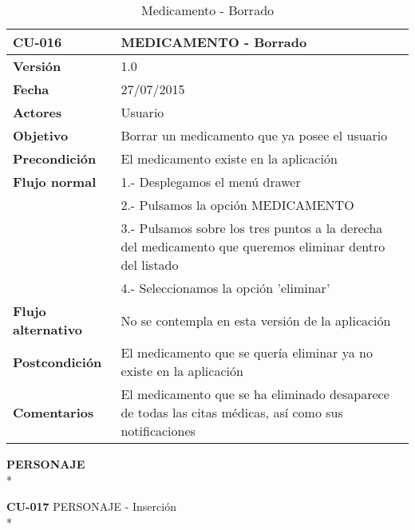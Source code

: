 \documentclass[../pfc.tex]{subfiles}
\begin{document}
		\begin{table}[H]
			\centering
			\begin{tabular}[t]{|p{3cm}|p{9.5cm}|}
				\hline \textbf{CU-016} & \textbf{MEDICAMENTO - Borrado} \\*
				\hline\hline \textbf{Versión} & 1.0 \\*
				\hline\hline \textbf{Fecha} & 27/07/2015 \\*
				\hline\textbf{Actores} 	& Usuario\\*
				\hline \textbf{Objetivo} & Borrar un medicamento que ya posee el usuario\\* 			
				\hline \textbf{Precondición} & El medicamento existe en la aplicación\\* 
				\hline \textbf{Flujo normal} & 1.- Desplegamos el menú drawer \\* 
				& 2.- Pulsamos la opción MEDICAMENTO\\*	
				& 3.- Pulsamos sobre los tres puntos a la derecha del medicamento que queremos eliminar dentro del listado\\*	
				& 4.- Seleccionamos la opción 'eliminar'\\*	
				\hline \textbf{Flujo alternativo} & No se contempla en esta versión de la aplicación\\* 
				\hline \textbf{Postcondición} & El medicamento que se quería eliminar ya no existe en la aplicación \\* 
				\hline \textbf{Comentarios}   & El medicamento que se ha eliminado desaparece de todas las citas médicas, así como sus notificaciones\\*
				\hline
			\end{tabular}
			\caption{Medicamento - Borrado}
			\label{tabla:caso016}
		\end{table}
		
		
		
		\textbf{PERSONAJE}\\*
		
		\textbf{CU-017}	PERSONAJE - Inserción\\*
		
\end{document}

